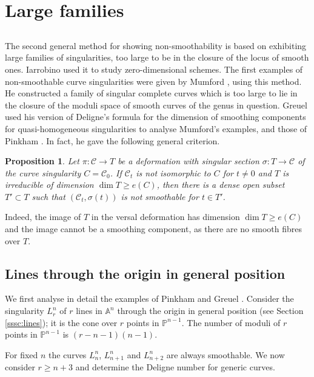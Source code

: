 \documentclass{amsart}
\renewcommand{\P}{\mathbb{P}}
\newcommand{\A}{\mathbb{A}}
\newtheorem{prop}[thm]{Proposition}
\theoremstyle{definition}
\theoremstyle{remark}
\begin{document}
\section{Large families}
\subsection{}
The second general method for showing non-smoothability is based on exhibiting large families of 
singularities, too large to be in the closure of the locus of smooth ones. Iarrobino \cite{Ia}
used it to study  zero-dimensional schemes.
The first examples of non-smoothable curve singularities were given by Mumford 
\cite{Mu},  using this method. He constructed a family of singular complete curves 
which is too large to lie in the closure of the moduli space of smooth curves of the genus in question.
Greuel \cite{Gr} used his version of Deligne's formula for the dimension of smoothing components
for quasi-homogeneous singularities to analyse Mumford's examples, and those of Pinkham \cite{Pi}.
In fact, he gave the following general criterion.


\begin{prop}\label{prop:greuel}
Let $\pi\colon \mathcal C \to T$ be a deformation with 
singular section $\sigma\colon T\to \mathcal C$ of the curve singularity
$C=\mathcal C_0$. If $\mathcal C_t$ is not isomorphic to $C$ for $t\neq0$
and $T$ is irreducible of dimension $\dim T \geq e(C)$, then there is a dense
open subset $T'\subset T$ such that $(\mathcal C_t,\sigma(t))$ is not 
smoothable for $t\in T'$.
\end{prop}
%
Indeed, the image of $T$ in the versal deformation has dimension $\dim T \geq e(C)$
and the image cannot be a smoothing component, as there are no smooth fibres
over $T$. 




\subsection{Lines through the origin in general position}
 We first analyse in detail the examples of Pinkham and Greuel \cite{Pi,Gr}.  
 Consider the singularity $L_r^n$ of $r$ lines in $\A^n$ through the origin in general position
 (see Section \ref{sssc:lines}); it is the 
 cone over $r$ points in $\P^{n-1}$. 
The number of moduli of $r$ points in $\P^{n-1}$
is  $(r-n-1)(n-1)$.  
% 

 For fixed $n$ the curves $L_n^n$, $L_{n+1}^n$ and $L_{n+2}^n$ are always
 smoothable. %
 We now consider $r\geq n+3$ and 
 determine the Deligne number for generic curves.
 
\end{document}
